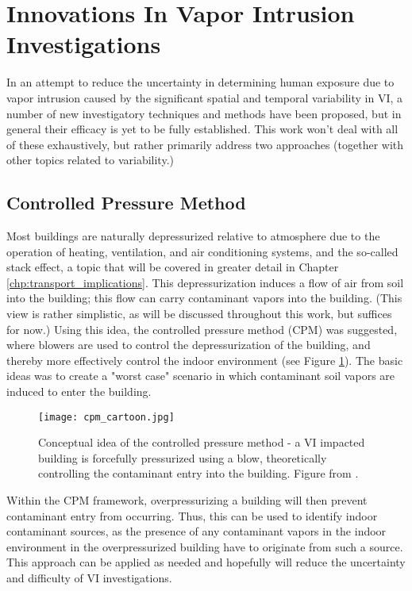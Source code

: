 \section{Innovations In Vapor Intrusion Investigations}

In an attempt to reduce the uncertainty in determining human exposure due to vapor intrusion caused by the significant spatial and temporal variability in VI, a number of new investigatory techniques and methods have been proposed, but in general their efficacy is yet to be fully established\cite{mchugh_recent_2017}.
This work won't deal with all of these exhaustively, but rather primarily address two approaches (together with other topics related to variability.)\par

\subsection{Controlled Pressure Method}

Most buildings are naturally depressurized relative to atmosphere due to the operation of heating, ventilation, and air conditioning systems, and the so-called stack effect, a topic that will be covered in greater detail in Chapter \ref{chp:transport_implications}.
This depressurization induces a flow of air from soil into the building; this flow can carry contaminant vapors into the building.
(This view is rather simplistic, as will be discussed throughout this work, but suffices for now.)
Using this idea, the controlled pressure method (CPM) was suggested, where blowers are used to control the depressurization of the building, and thereby more effectively control the indoor environment (see Figure \ref{fig:cpm_cartoon}).
The basic ideas was to create a "worst case" scenario in which contaminant soil vapors are induced to enter the building.\par

\begin{figure}[htb!]
  \centering
  \texttt{[image: cpm\_cartoon.jpg]}
  \caption[Overview of the controlled pressure method concept]{Conceptual idea of the controlled pressure method - a VI impacted building is forcefully pressurized using a blow, theoretically controlling the contaminant entry into the building. Figure from \citeauthor{holton_long-term_2015}\cite{holton_long-term_2015}.}
  \label{fig:cpm_cartoon}
\end{figure}

Within the CPM framework, overpressurizing a building will then prevent contaminant entry from occurring.
Thus, this can be used to identify indoor contaminant sources, as the presence of any contaminant vapors in the indoor environment in the overpressurized building have to originate from such a source.
This approach can be applied as needed and hopefully will reduce the uncertainty and difficulty of VI investigations\cite{mchugh_evaluation_2012}.\par

